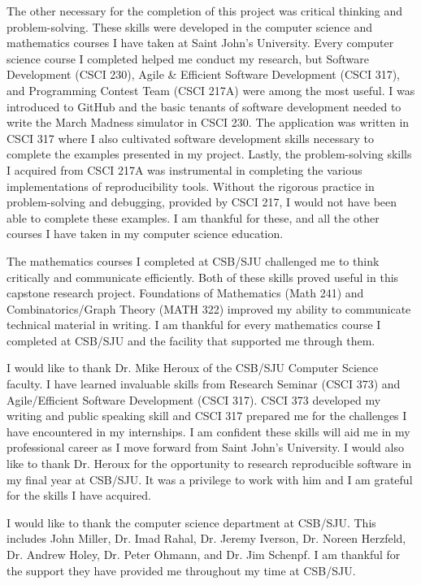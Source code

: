 \documentclass{IEEEtran}
\begin{document}
The other necessary for the completion of this project was critical thinking and problem-solving. These skills were developed in the computer science and mathematics courses I have taken at Saint John's University. Every computer science course I completed helped me conduct my research, but Software Development (CSCI 230), Agile \& Efficient Software Development (CSCI 317), and Programming Contest Team (CSCI 217A) were among the most useful. I was introduced to GitHub and the basic tenants of software development needed to write the March Madness simulator in CSCI 230. The application was written in CSCI 317 where I also cultivated software development skills necessary to complete the examples presented in my project. Lastly, the problem-solving skills I acquired from CSCI 217A was instrumental in completing the various implementations of reproducibility tools. Without the rigorous practice in problem-solving and debugging, provided by CSCI 217, I would not have been able to complete these examples. I am thankful for these, and all the other courses I have taken in my computer science education.  

The mathematics courses I completed at CSB/SJU challenged me to think critically and communicate efficiently. Both of these skills proved useful in this capstone research project. Foundations of Mathematics (Math 241) and Combinatorics/Graph Theory (MATH 322) improved my ability to communicate technical material in writing. I am thankful for every mathematics course I completed at CSB/SJU and the facility that supported me through them.         

I would like to thank Dr. Mike Heroux of the CSB/SJU Computer Science faculty. I have learned invaluable skills from Research Seminar (CSCI 373) and Agile/Efficient Software Development (CSCI 317). CSCI 373 developed my writing and public speaking skill and CSCI 317 prepared me for the challenges I have encountered in my internships. I am confident these skills will aid me in my professional career as I move forward from Saint John's University. I would also like to thank Dr. Heroux for the opportunity to research reproducible software in my final year at CSB/SJU. It was a privilege to work with him and I am grateful for the skills I have acquired.       

I would like to thank the computer science department at CSB/SJU. This includes John Miller, Dr. Imad Rahal, Dr. Jeremy Iverson, Dr. Noreen Herzfeld, Dr. Andrew Holey, Dr. Peter Ohmann, and Dr. Jim Schenpf. I am thankful for the support they have provided me throughout my time at CSB/SJU.
\end{document}
